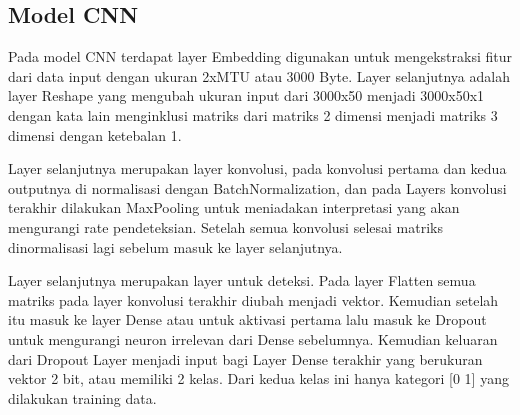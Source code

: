 \documentclass[./skripsi.tex]{subfiles}
\begin{document}
\subsection{Model CNN}
{\centering
{}
\label{svc_loss}
}
\par Pada model CNN terdapat layer Embedding digunakan untuk mengekstraksi fitur dari data input dengan ukuran 2xMTU atau 3000 Byte. Layer selanjutnya adalah layer Reshape yang mengubah ukuran input dari 3000x50 menjadi 3000x50x1 dengan kata lain menginklusi matriks dari matriks 2 dimensi menjadi matriks 3 dimensi dengan ketebalan 1.
\par Layer selanjutnya merupakan layer konvolusi, pada konvolusi pertama dan kedua outputnya di normalisasi dengan BatchNormalization, dan pada Layers konvolusi terakhir dilakukan MaxPooling untuk meniadakan interpretasi yang akan mengurangi rate pendeteksian. Setelah semua konvolusi selesai matriks dinormalisasi lagi sebelum masuk ke layer selanjutnya.
\par Layer selanjutnya merupakan layer untuk deteksi. Pada layer Flatten semua matriks pada layer konvolusi terakhir diubah menjadi vektor. Kemudian setelah itu masuk ke layer Dense atau untuk aktivasi pertama lalu masuk ke Dropout untuk mengurangi neuron irrelevan dari Dense sebelumnya. Kemudian keluaran dari Dropout Layer menjadi input bagi Layer Dense terakhir yang berukuran vektor 2 bit, atau memiliki 2 kelas. Dari kedua kelas ini hanya kategori [0 1] yang dilakukan training data.
\end{document}
